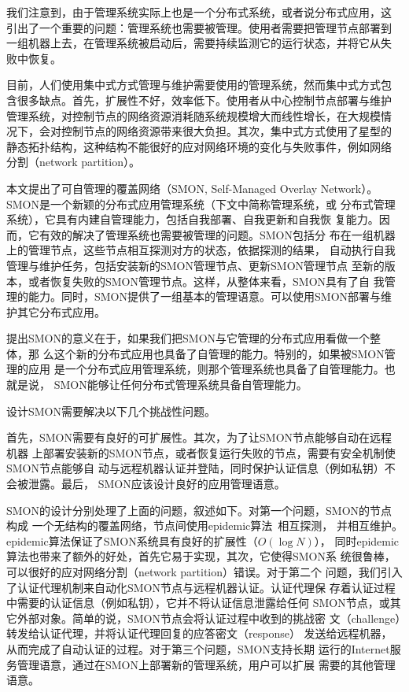 我们注意到，由于管理系统实际上也是一个分布式系统，或者说分布式应用，这
引出了一个重要的问题：管理系统也需要被管理。使用者需要把管理节点部署到
一组机器上去，在管理系统被启动后，需要持续监测它的运行状态，并将它从失
败中恢复。


目前，人们使用集中式方式管理与维护需要使用的管理系统，然而集中式方式包
含很多缺点。首先，扩展性不好，效率低下。使用者从中心控制节点部署与维护
管理系统，对控制节点的网络资源消耗随系统规模增大而线性增长，在大规模情
况下，会对控制节点的网络资源带来很大负担。其次，集中式方式使用了星型的
静态拓扑结构，这种结构不能很好的应对网络环境的变化与失败事件，例如网络
分割（network partition）。


本文提出了可自管理的覆盖网络（SMON, Self-Managed Overlay
Network）。SMON是一个新颖的分布式应用管理系统（下文中简称管理系统，或
分布式管理系统），它具有内建自管理能力，包括自我部署、自我更新和自我恢
复能力。因而，它有效的解决了管理系统也需要被管理的问题。SMON包括分
布在一组机器上的管理节点，这些节点相互探测对方的状态，依据探测的结果，
自动执行自我管理与维护任务，包括安装新的SMON管理节点、更新SMON管理节点
至新的版本，或者恢复失败的SMON管理节点。这样，从整体来看，SMON具有了自
我管理的能力。同时，SMON提供了一组基本的管理语意。可以使用SMON部署与维
护其它分布式应用。

提出SMON的意义在于，如果我们把SMON与它管理的分布式应用看做一个整体，那
么这个新的分布式应用也具备了自管理的能力。特别的，如果被SMON管理的应用
是一个分布式应用管理系统，则那个管理系统也具备了自管理能力。也就是说，
SMON能够让任何分布式管理系统具备自管理能力。

设计SMON需要解决以下几个挑战性问题。

首先，SMON需要有良好的可扩展性。其次，为了让SMON节点能够自动在远程机器
上部署安装新的SMON节点，或者恢复运行失败的节点，需要有安全机制使SMON节点能够自
动与远程机器认证并登陆，同时保护认证信息（例如私钥）不会被泄露。最后，
SMON应该设计良好的应用管理语意。

SMON的设计分别处理了上面的问题，叙述如下。对第一个问题，SMON的节点构成
一个无结构的覆盖网络，节点间使用epidemic算法~\cite{Demers1987}相互探测，
并相互维护。epidemic算法保证了SMON系统具有良好的扩展性（$O(\log N)$），
同时epidemic算法也带来了额外的好处，首先它易于实现，其次，它使得SMON系
统很鲁棒，可以很好的应对网络分割（network partition）错误。对于第二个
问题，我们引入了认证代理机制来自动化SMON节点与远程机器认证。认证代理保
存着认证过程中需要的认证信息（例如私钥），它并不将认证信息泄露给任何
SMON节点，或其它外部对象。简单的说，SMON节点会将认证过程中收到的挑战密
文（challenge）转发给认证代理，并将认证代理回复的应答密文（response）
发送给远程机器，从而完成了自动认证的过程。对于第三个问题，SMON支持长期
运行的Internet服务管理语意，通过在SMON上部署新的管理系统，用户可以扩展
需要的其他管理语意。

